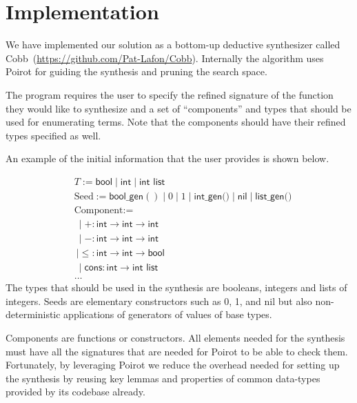 \documentclass[review, sigplan]{acmart}
\begin{document}
\section{Implementation}
We have implemented our solution as a bottom-up deductive synthesizer called
Cobb~(\url{https://github.com/Pat-Lafon/Cobb}).
Internally the algorithm uses Poirot for guiding the synthesis and pruning
the search space.

The program requires the user to specify the refined signature of the function
they would like to synthesize and a set of ``components'' and types
that should be used for enumerating terms.
Note that the components should have their refined types specified as
well.

An example of the initial information that the user provides
is shown below.

\begin{align*}
   & T := \textsf{bool} \mid \textsf{int} \mid \textsf{int list}                                                            \\
   & \text{Seed} := \textsf{bool\_gen}() \mid 0 \mid 1 \mid \textsf{int\_gen()} \mid \textsf{nil} \mid \textsf{list\_gen()} \\
   & \text{Component} :=                                                                                                    \\
   & \  \mid +: \textsf{int} \rightarrow \textsf{int} \rightarrow \textsf{int}                                              \\
   & \  \mid -: \textsf{int} \rightarrow \textsf{int} \rightarrow \textsf{int}                                              \\
   & \  \mid \leq: \textsf{int} \rightarrow \textsf{int} \rightarrow \textsf{bool}                                          \\
   & \  \mid \textsf{cons}: \textsf{int} \rightarrow \textsf{int list}                                                      \\
   & \dots
\end{align*}
The types that should be used in the synthesis are
booleans, integers and lists of integers.
Seeds are elementary constructors such as 0, 1, and \textsf{nil}
but also non-deterministic applications of generators of values of
base types.

Components are functions or constructors.
All elements needed for the synthesis must have all the signatures
that are needed for Poirot to be able to check them.
Fortunately, by leveraging Poirot we reduce the overhead needed for setting
up the synthesis by reusing key lemmas and properties of common
data-types provided by its codebase already.
\end{document}
